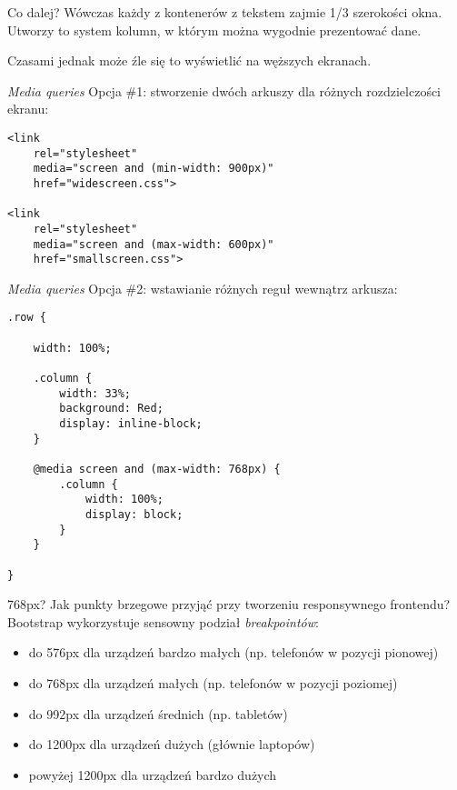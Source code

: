\begin{frame}{Co dalej?}	
	Wówczas każdy z kontenerów z tekstem zajmie 1/3 szerokości okna. Utworzy to system kolumn, w którym można wygodnie prezentować dane.
	
	Czasami jednak może źle się to wyświetlić na węższych ekranach.
\end{frame}

\begin{frame}[fragile]{\emph{Media queries}}
	Opcja \#1: stworzenie dwóch arkuszy dla różnych rozdzielczości ekranu:
	\begin{lstlisting}
<link
    rel="stylesheet"
    media="screen and (min-width: 900px)"
    href="widescreen.css">
    
<link
    rel="stylesheet"
    media="screen and (max-width: 600px)"
    href="smallscreen.css">
	\end{lstlisting}
\end{frame}

\begin{frame}[fragile]{\emph{Media queries}}
	Opcja \#2: wstawianie różnych reguł wewnątrz arkusza:
	\begin{lstlisting}
.row {
    
    width: 100%;

    .column {
        width: 33%;
        background: Red;
        display: inline-block;
    }
    
    @media screen and (max-width: 768px) {
        .column {
            width: 100%;
            display: block;
        }
    }

}
	\end{lstlisting}
\end{frame}

\begin{frame}{768px?}	
	Jak punkty brzegowe przyjąć przy tworzeniu responsywnego frontendu? Bootstrap wykorzystuje sensowny podział \emph{breakpointów}:
	\begin{itemize}
	\item do 576px dla urządzeń bardzo małych (np. telefonów w pozycji pionowej)
	\item do 768px dla urządzeń małych (np. telefonów w pozycji poziomej)
	\item do 992px dla urządzeń średnich (np. tabletów)
	\item do 1200px dla urządzeń dużych (głównie laptopów)
	\item powyżej 1200px dla urządzeń bardzo dużych
	\end{itemize}
\end{frame}

